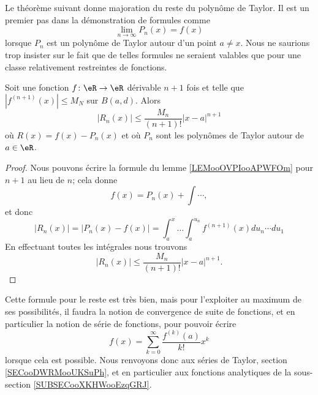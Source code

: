 Le théorème suivant donne majoration du reste du polynôme de Taylor. Il est un premier pas dans la démonstration de formules comme
\begin{equation}
	\lim_{n\to \infty} P_n(x)=f(x)
\end{equation}
lorsque \( P_n\) est un polynôme de Taylor autour d'un point \( a\neq x\). Nous ne saurions trop insister sur le fait que de telles formules ne seraient valables que pour une classe relativement restreintes de fonctions.
\begin{theorem}       \label{THOooEUVEooXZJTRL}
	Soit une fonction \( f\colon \eR\to \eR\) dérivable \( n+1\) fois et telle que \( | f^{(n+1)}(x) |\leq M_N\) sur \( B(a,d)\). Alors
	\begin{equation}
		| R_n(x) |\leq \frac{ M_n }{ (n+1)! }| x-a |^{n+1}
	\end{equation}
	où \( R(x)=f(x)-P_n(x)\) et où \( P_n\) sont les polynômes de Taylor autour de \( a\in \eR\).
\end{theorem}

\begin{proof}
	Nous pouvons écrire la formule du lemme \ref{LEMooOVPIooAPWFOm} pour \( n+1\) au lieu de \( n\); cela donne
	\begin{equation}
		f(x)=P_n(x)+\int\cdots,
	\end{equation}
	et donc
	\begin{equation}
		| R_n(x) |=| P_n(x)-f(x) |=\int_a^x\ldots\int_a^{u_n}f^{(n+1)}(x)du_n\cdots du_{1}
	\end{equation}
	En effectuant toutes les intégrales nous trouvons
	\begin{equation}
		| R_n(x) |\leq \frac{ M_n }{ (n+1)! }| x-a |^{n+1}.
	\end{equation}
\end{proof}
Cette formule pour le reste est très bien, mais pour l'exploiter au maximum de ses possibilités, il faudra la notion de convergence de suite de fonctions, et en particulier la notion de série de fonctions, pour pouvoir écrire
\begin{equation}
	f(x)=\sum_{k=0}^{\infty}\frac{ f^{(k)}(a) }{ k! }x^k
\end{equation}
lorsque cela est possible. Nous renvoyons donc aux séries de Taylor, section \ref{SECooDWRMooUKSuPh}, et en particulier aux fonctions analytiques de la sous-section \ref{SUBSECooXKHWooEzqGRJ}.

